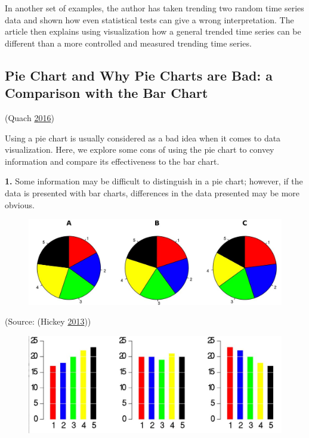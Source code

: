 \documentclass[]{book}
\begin{document}
In another set of examples, the author has taken trending two random
time series data and shown how even statistical tests can give a wrong
interpretation. The article then explains using visualization how a
general trended time series can be different than a more controlled and
measured trending time series.

\subsection{Pie Chart and Why Pie Charts are Bad: a Comparison with the
Bar
Chart}\label{pie-chart-and-why-pie-charts-are-bad-a-comparison-with-the-bar-chart}

(Quach \protect\hyperlink{ref-quach-penny}{2016})

Using a pie chart is usually considered as a bad idea when it comes to
data visualization. Here, we explore some cons of using the pie chart to
convey information and compare its effectiveness to the bar chart.

\textbf{1.} Some information may be difficult to distinguish in a pie
chart; however, if the data is presented with bar charts, differences in
the data presented may be more obvious.

\begin{figure}
\centering
\includegraphics{images/hickey-before.jpg}
\caption{}
\end{figure}

(Source: (Hickey \protect\hyperlink{ref-hickey-pie-worst}{2013}))

\begin{figure}
\centering
\includegraphics{images/hickey-after.jpg}
\caption{}
\end{figure}
\end{document}
